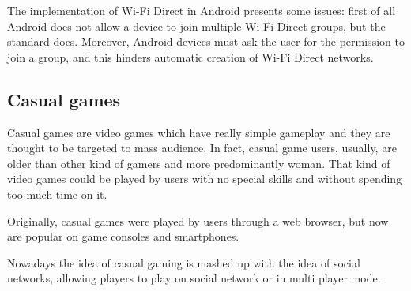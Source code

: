 The implementation of Wi-Fi Direct in Android presents some issues: first of all
Android does not allow a device to join multiple Wi-Fi Direct groups,
but the standard does. Moreover, Android devices must ask the user for the
permission to join a group, and this hinders automatic creation of Wi-Fi Direct
networks.

\subsection{Casual games}
Casual games are video games which have really simple gameplay and they are
thought to be targeted to mass audience. In fact, casual game users, usually, are
older than other kind of gamers and more predominantly woman. That kind of video
games could be played by users with no special skills and without spending too much 
time on it.

Originally, casual games were played by users through a web browser, but now 
are popular on game consoles and smartphones.

Nowadays the idea of casual gaming is mashed up with the idea of social networks,
allowing players to play on social network or in multi player mode.